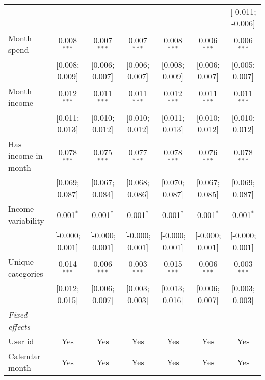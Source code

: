 \begin{table}[htbp]
\begin{threeparttable}[b]
\begin{tabular}{lcccccc}
                                        &                 &                 &                 &                  &                  & [-0.011; -0.006]\\   
         Month spend                    & 0.008$^{***}$   & 0.007$^{***}$   & 0.007$^{***}$   & 0.008$^{***}$    & 0.006$^{***}$    & 0.006$^{***}$\\   
                                        & [0.008; 0.009]  & [0.006; 0.007]  & [0.006; 0.007]  & [0.008; 0.009]   & [0.006; 0.007]   & [0.005; 0.007]\\   
         Month income                   & 0.012$^{***}$   & 0.011$^{***}$   & 0.011$^{***}$   & 0.012$^{***}$    & 0.011$^{***}$    & 0.011$^{***}$\\   
                                        & [0.011; 0.013]  & [0.010; 0.012]  & [0.010; 0.012]  & [0.011; 0.013]   & [0.010; 0.012]   & [0.010; 0.012]\\   
         Has income in month            & 0.078$^{***}$   & 0.075$^{***}$   & 0.077$^{***}$   & 0.078$^{***}$    & 0.076$^{***}$    & 0.078$^{***}$\\   
                                        & [0.069; 0.087]  & [0.067; 0.084]  & [0.068; 0.086]  & [0.070; 0.087]   & [0.067; 0.085]   & [0.069; 0.087]\\   
         Income variability             & 0.001$^{*}$     & 0.001$^{*}$     & 0.001$^{*}$     & 0.001$^{*}$      & 0.001$^{*}$      & 0.001$^{*}$\\   
                                        & [-0.000; 0.001] & [-0.000; 0.001] & [-0.000; 0.001] & [-0.000; 0.001]  & [-0.000; 0.001]  & [-0.000; 0.001]\\   
         Unique categories              & 0.014$^{***}$   & 0.006$^{***}$   & 0.003$^{***}$   & 0.015$^{***}$    & 0.006$^{***}$    & 0.003$^{***}$\\   
                                        & [0.012; 0.015]  & [0.006; 0.007]  & [0.003; 0.003]  & [0.013; 0.016]   & [0.006; 0.007]   & [0.003; 0.003]\\   
         \midrule
         \emph{Fixed-effects}\\
         User id                        & Yes             & Yes             & Yes             & Yes              & Yes              & Yes\\  
         Calendar month                 & Yes             & Yes             & Yes             & Yes              & Yes              & Yes\\  
         \midrule

\end{tabular}
\end{threeparttable}
\end{table}
